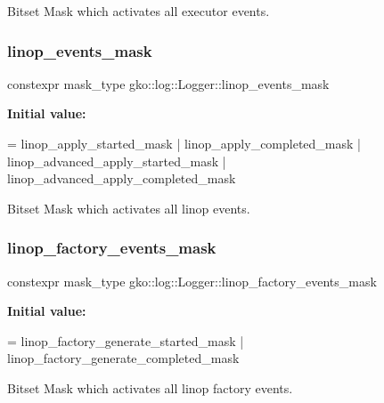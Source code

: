 Bitset Mask which activates all executor events. 

\mbox{\label{classgko_1_1log_1_1Logger_a3e75086ec35aea9d9c0ade7774bfc1ba}} 
\subsubsection{\texorpdfstring{linop\+\_\+events\+\_\+mask}{linop\_events\_mask}}
{\footnotesize\ttfamily constexpr mask\+\_\+type gko\+::log\+::\+Logger\+::linop\+\_\+events\+\_\+mask\hspace{0.3cm}{\ttfamily [static]}}

{\bfseries Initial value\+:}
\begin{DoxyCode}
=
        linop\_apply\_started\_mask | linop\_apply\_completed\_mask |
        linop\_advanced\_apply\_started\_mask | linop\_advanced\_apply\_completed\_mask
\end{DoxyCode}


Bitset Mask which activates all linop events. 

\mbox{\label{classgko_1_1log_1_1Logger_ad6fb77d4d5610bc7299087f7149a7f16}} 
\subsubsection{\texorpdfstring{linop\+\_\+factory\+\_\+events\+\_\+mask}{linop\_factory\_events\_mask}}
{\footnotesize\ttfamily constexpr mask\+\_\+type gko\+::log\+::\+Logger\+::linop\+\_\+factory\+\_\+events\+\_\+mask\hspace{0.3cm}{\ttfamily [static]}}

{\bfseries Initial value\+:}
\begin{DoxyCode}
=
        linop\_factory\_generate\_started\_mask |
        linop\_factory\_generate\_completed\_mask
\end{DoxyCode}


Bitset Mask which activates all linop factory events. 

